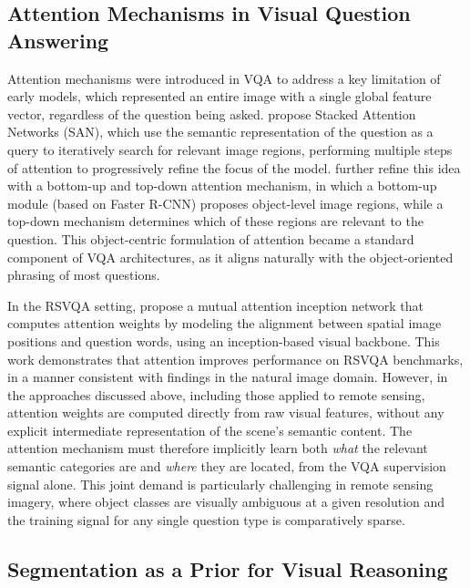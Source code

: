 \subsection{Attention Mechanisms in Visual Question Answering}
\label{sec:chap4_rw_attention}

Attention mechanisms were introduced in VQA to address a
key limitation of early models, which represented an
entire image with a single global feature vector,
regardless of the question being asked.
\textcite{yang2016stacked} propose Stacked Attention
Networks (SAN), which use the semantic representation of
the question as a query to iteratively search for
relevant image regions, performing multiple steps of
attention to progressively refine the focus of the model.
\textcite{anderson2018bottomup} further refine this idea with
a bottom-up and top-down attention mechanism, in which a
bottom-up module (based on Faster R-CNN) proposes
object-level image regions, while a top-down mechanism
determines which of these regions are relevant to the
question. This object-centric formulation of attention
became a standard component of VQA architectures, as it
aligns naturally with the object-oriented phrasing of most
questions.

In the RSVQA setting, \textcite{zheng2021mutual} propose a
mutual attention inception network that computes attention
weights by modeling the alignment between spatial image
positions and question words, using an inception-based
visual backbone. This work demonstrates that attention
improves performance on RSVQA benchmarks, in a manner
consistent with findings in the natural image domain.
However, in the approaches discussed above,
including those applied to remote sensing, attention
weights are computed directly from raw visual features,
without any explicit intermediate representation of the
scene's semantic content. The attention mechanism must
therefore implicitly learn both \textit{what} the relevant
semantic categories are and \textit{where} they are
located, from the VQA supervision signal alone. This
joint demand is particularly challenging in remote
sensing imagery, where object classes are visually
ambiguous at a given resolution and the training signal
for any single question type is comparatively sparse.

\subsection{Segmentation as a Prior for Visual Reasoning}
\label{sec:chap4_rw_seg}

